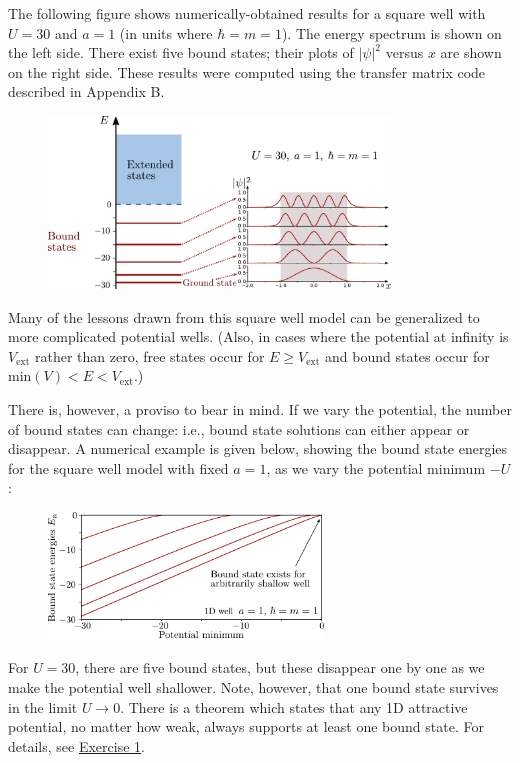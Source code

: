 \documentclass[pra,12pt]{revtex4}
\begin{document}
The following figure shows numerically-obtained results for a square
well with $U = 30$ and $a=1$ (in units where $\hbar = m =1$).  The
energy spectrum is shown on the left side.  There exist five bound
states; their plots of $|\psi|^2$ versus $x$ are shown on the right
side.  These results were computed using the transfer matrix code
described in Appendix B.

\begin{figure}[h]
  \centering\includegraphics[width=0.81\textwidth]{boundvsextended}
\end{figure}

Many of the lessons drawn from this square well model can be
generalized to more complicated potential wells.  (Also, in cases
where the potential at infinity is $V_{\textrm{ext}}$ rather than
zero, free states occur for $E \ge V_{\textrm{ext}}$ and bound states
occur for $\textrm{min}(V) < E < V_{\textrm{ext}}$.)

There is, however, a proviso to bear in mind.  If we vary the
potential, the number of bound states can change: i.e., bound state
solutions can either appear or disappear.  A numerical example is
given below, showing the bound state energies for the square well
model with fixed $a = 1$, as we vary the potential minimum $-U$:

\begin{figure}[h]
  \centering\includegraphics[width=0.65\textwidth]{boundstate1d}
\end{figure}

For $U = 30$, there are five bound states, but these disappear one by
one as we make the potential well shallower.  Note, however, that one
bound state survives in the limit $U \rightarrow 0$.  There is a
theorem which states that any 1D attractive potential, no matter how
weak, always supports at least one bound state.  For details, see
\hyperref[ex:boundstate]{Exercise 1}.
\end{document}
